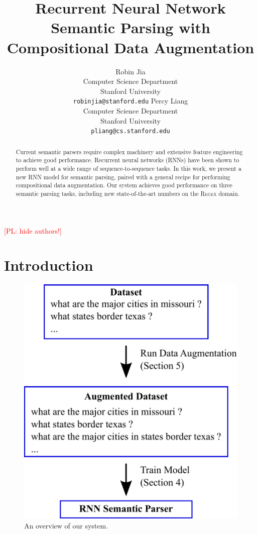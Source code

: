 \documentclass[11pt,letterpaper]{article}
\title{Recurrent Neural Network Semantic Parsing
with Compositional Data Augmentation}
\author{Robin Jia\\
	    Computer Science Department\\
      Stanford University\\
	    {\tt robinjia@stanford.edu}
	  \And
    Percy Liang\\
    Computer Science Department\\
  	Stanford University\\
  {\tt pliang@cs.stanford.edu}}
\date{}
\newcommand{\regex}{\textsc{Regex}\xspace}
\newcommand\pl[1]{\textcolor{red}{[PL: #1]}}
\begin{document}
\maketitle

\pl{hide authors!}

\begin{abstract}
Current semantic parsers require complex machinery and
extensive feature engineering to achieve good performance.
Recurrent neural networks (RNNs)
have been shown to perform well at a wide range of sequence-to-sequence tasks.
In this work, we present a new RNN model for semantic parsing, paired with a general
recipe for performing compositional data augmentation.
Our system achieves good performance on three semantic parsing tasks,
including new state-of-the-art numbers on the \regex domain.
\end{abstract}

\section{Introduction}
\begin{figure}[t] 
\begin{center} 
  \includegraphics[scale=0.4]{fig-overview.pdf}
\end{center} 
\caption{An overview of our system.}
\label{fig:overview}
\end{figure}
\end{document}
